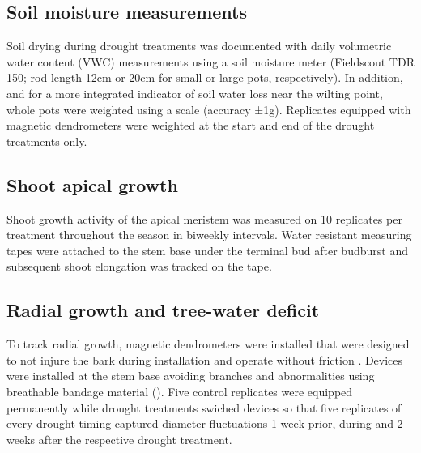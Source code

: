 \documentclass{article}
\begin{document}
	\subsection*{Soil moisture measurements}
Soil drying during drought treatments was documented with daily volumetric water content (VWC) measurements using a soil moisture meter (Fieldscout TDR 150; rod length 12cm or 20cm for small or large pots, respectively). In addition, and for a more integrated indicator of soil water loss near the wilting point, whole pots were weighted using a scale (accuracy ±1g). Replicates equipped with magnetic dendrometers were weighted at the start and end of the drought treatments only.  %

	\subsection*{Shoot apical growth}
	Shoot growth activity of the apical meristem was measured on 10 replicates per treatment throughout the season in biweekly intervals. Water resistant measuring tapes were attached to the stem base under the terminal bud after budburst and subsequent shoot elongation was tracked on the tape.  \\

	\subsection*{Radial growth and tree-water deficit}
To track radial growth, magnetic dendrometers were installed that were designed to not injure the bark during installation and operate without friction \citep{clonchHighPrecisionZerofriction2021}. Devices were installed at the stem base avoiding branches and abnormalities using breathable bandage material (). Five control replicates were equipped permanently while drought treatments swiched devices so that five replicates of every drought timing captured diameter fluctuations 1 week prior, during and 2 weeks after the respective drought treatment. \\ %
\end{document}
